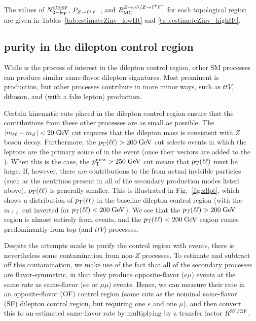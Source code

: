 The values of $N_{\mathrm{2-lep}}^{\mathrm{CRSF}}$, $P_{Z\to\ell^+\ell^-}$, and $R_{\mathrm{MC}}^{Z\to\nu\bar{\nu}/Z\to\ell^+\ell^-}$ for each topological 
region are given in Tables~\ref{tab:estimateZinv_lowHt} and \ref{tab:estimateZinv_highHt}.

\subsection{\zll purity in the dilepton control region}
\label{sec:dilep_bkgs}
While \zll is the process of interest in the dilepton control region, other SM processes can
produce similar same-flavor dilepton signatures. Most prominent is \ttbar production, but other
processes contribute in more minor ways, such as $t\bar{t}V$, diboson, and \wjets (with a fake
lepton) production.

Certain kinematic cuts placed in the dilepton control region ensure that the contributions
from these other processes are as small as possible. The $|m_{\ell\ell}-m_Z|<20\;\text{Ge\hspace{-.08em}V}$ cut requires
that the dilepton mass is consistent with $Z$ boson decay. Furthermore, the $p_{\mathrm{T}}(\ell\ell)>200\;\text{Ge\hspace{-.08em}V}$ cut
selects events in which the leptons are the primary souce of \ptmiss in the event (once their 
vectors are added to the \vMet). When this is the case, the $p_{\mathrm{T}}^{\mathrm{miss}}>250\;\text{Ge\hspace{-.08em}V}$ cut means that
$p_{\mathrm{T}}(\ell\ell)$ must be large. If, however, there are contributions to the \ptmiss from actual
invisible particles (such as the neutrinos present in all of the secondary production modes listed above),
$p_{\mathrm{T}}(\ell\ell)$ is generally smaller. This is illustrated in Fig.~\ref{fig:zllpt}, which shows a distribution
of $p_{\mathrm{T}}(\ell\ell)$ in the baseline dilepton control region (with the $m_{\ell\ell}$ cut inverted for
$p_{\mathrm{T}}(\ell\ell)<200\;\text{Ge\hspace{-.08em}V}$). We see that the $p_{\mathrm{T}}(\ell\ell)>200\;\text{Ge\hspace{-.08em}V}$ region is almost entirely from \zll events,
and the $p_{\mathrm{T}}(\ell\ell)<200\;\text{Ge\hspace{-.08em}V}$ region comes predominantly from top (\ttbar and $t\bar{t}V$) processes.

Despite the attempts made to purify the control region with \zll events, there is nevertheless some contamination
from non-$Z$ processes. To estimate and subtract off this contamination, we make use of the fact that
all of the secondary processes are flavor-symmetric, in that they produce opposite-flavor ($e\mu$) events
at the same rate as same-flavor ($ee$ or $\mu\mu$) events. Hence, we can measure their rate in an 
opposite-flavor (OF) control region (same cuts as the nominal same-flavor (SF) dilepton control region, but 
requiring one $e$ and one $\mu$), and then convert this to an estimated same-flavor rate by 
multiplying by a transfer factor $R^{\mathrm{SF/OF}}$.

